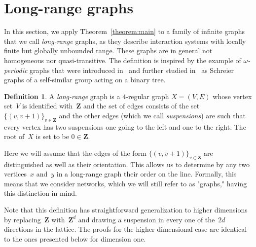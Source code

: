 \documentclass[english]{article}
\theoremstyle{definition}
\newtheorem{definition}[lemma]{Definition}
\newcommand*{\field}[1]{\mathbf{#1}} %
\newcommand*\Z{\field{Z}} %
\begin{document}




\section{Long-range graphs}\label{section:long-range}

In this section, we apply Theorem~\ref{theorem:main} to a family of infinite graphs that we call \emph{long-range} graphs, as they describe interaction systems with locally finite but globally unbounded range. These graphs are in general not homogeneous nor quasi-transitive. The definition is inspired by the example of \emph{$\omega$-periodic} graphs that were introduced in~\cite{BH} and further studied in~\cite{BCDN} as Schreier graphs of a self-similar group acting on a binary tree.




\begin{definition}
    A \emph{long-range} graph is a $4$-regular graph $X = (V, E)$ whose vertex set~$V$ is identified with~$\Z$ and the set of edges consists of the set $\{(v, v + 1)\}_{v \in \Z}$ and the other edges (which we call \emph{suspensions}) are such that every vertex has two suspensions one going to the left and one to the right. The root of~$X$ is set to be $0 \in \Z$.

    Here we will assume that the edges of the form $\{(v, v + 1)\}_{v \in \Z}$ are distinguished as well as their orientation. This allows us to determine by any two vertices~$x$ and~$y$ in a long-range graph their order on the line. Formally, this means that we consider networks, which we will still refer to as "graphs," having this distinction in mind.   
\end{definition}

    Note that this definition has straightforward generalization to higher dimensions by replacing~$\Z$ with~$\Z^d$ and drawing a suspension in every one of the~$2d$ directions in the lattice. The proofs for the higher-dimensional case are identical to the ones presented below for dimension one. 
    
\end{document}
